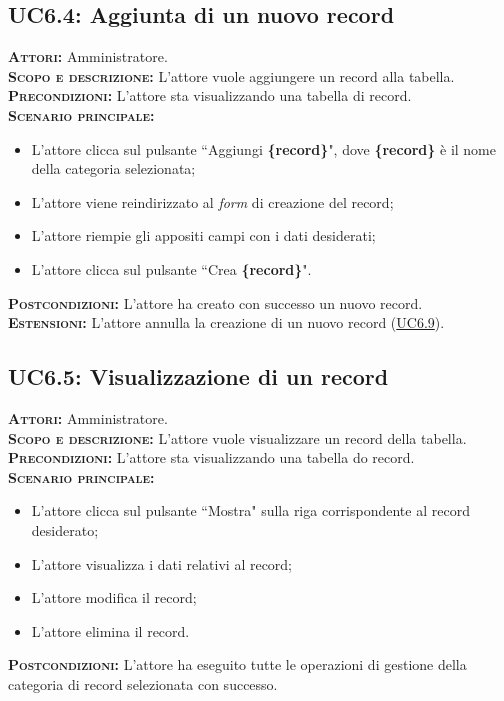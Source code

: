 \subsection{UC6.4: Aggiunta di un nuovo record}
\label{sec:UC64}
\textsc{\textbf{Attori:}} Amministratore.\\
\textsc{\textbf{Scopo e descrizione:}} L'attore vuole aggiungere un record alla tabella.\\
\textsc{\textsc{\textbf{Precondizioni:}}} L'attore sta visualizzando una tabella di record.\\
\textsc{\textbf{Scenario principale:}} 
\begin{itemize}
    \item L'attore clicca sul pulsante ``Aggiungi \textbf{\{record\}}", dove \textbf{\{record\}} è il nome della categoria selezionata;
    \item L'attore viene reindirizzato al \textit{form} di creazione del record;
    \item L'attore riempie gli appositi campi con i dati desiderati;
    \item L'attore clicca sul pulsante ``Crea \textbf{\{record\}}".
\end{itemize}
\textsc{\textbf{Postcondizioni:}} L'attore ha creato con successo un nuovo record.\\
\textsc{\textbf{Estensioni:}} L'attore annulla la creazione di un nuovo record (\hyperref[sec:UC69]{UC6.9}).

\subsection{UC6.5: Visualizzazione di un record}
\label{sec:UC65}
\textsc{\textbf{Attori:}} Amministratore.\\
\textsc{\textbf{Scopo e descrizione:}} L'attore vuole visualizzare un record della tabella.\\
\textsc{\textsc{\textbf{Precondizioni:}}} L'attore sta visualizzando una tabella do record.\\
\textsc{\textbf{Scenario principale:}} 
\begin{itemize}
    \item L'attore clicca sul pulsante ``Mostra" sulla riga corrispondente al record desiderato;
    \item L'attore visualizza i dati relativi al record;
    \item L'attore modifica il record;
    \item L'attore elimina il record.
\end{itemize}
\textsc{\textbf{Postcondizioni:}} L'attore ha eseguito tutte le operazioni di gestione della categoria di record selezionata con successo.

